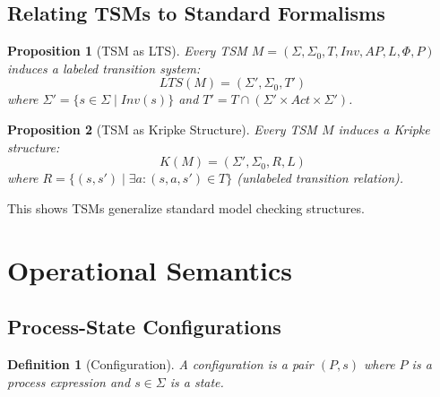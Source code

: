 \documentclass[conference]{IEEEtran}
\newtheorem{definition}{Definition}
\newtheorem{proposition}{Proposition}
\begin{document}
\subsection{Relating TSMs to Standard Formalisms}

\begin{proposition}[TSM as LTS]
Every TSM $M = (\Sigma, \Sigma_0, T, Inv, AP, L, \Phi, P)$ induces a labeled transition system:
\begin{equation}
LTS(M) = (\Sigma', \Sigma_0, T')
\end{equation}
where $\Sigma' = \{s \in \Sigma \mid Inv(s)\}$ and $T' = T \cap (\Sigma' \times Act \times \Sigma')$.
\end{proposition}

\begin{proposition}[TSM as Kripke Structure]
Every TSM $M$ induces a Kripke structure:
\begin{equation}
K(M) = (\Sigma', \Sigma_0, R, L)
\end{equation}
where $R = \{(s, s') \mid \exists a: (s, a, s') \in T\}$ (unlabeled transition relation).
\end{proposition}

This shows TSMs generalize standard model checking structures.

\section{Operational Semantics}
\label{sec:operational}

\subsection{Process-State Configurations}

\begin{definition}[Configuration]
A \textit{configuration} is a pair $(P, s)$ where $P$ is a process expression and $s \in \Sigma$ is a state.
\end{definition}
\end{document}
